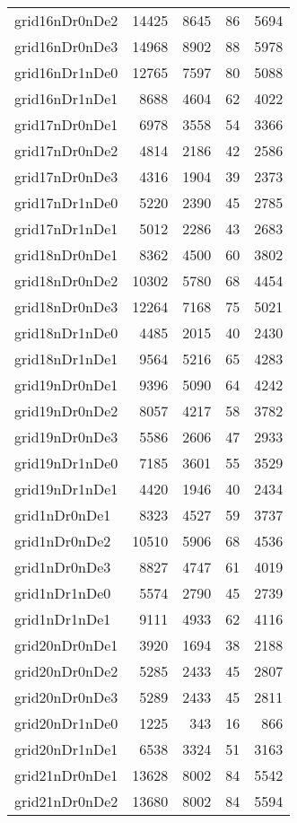 \begin{longtable}{lrrrr}
grid16nDr0nDe2 & 14425 & 8645 & 86 & 5694 \\
grid16nDr0nDe3 & 14968 & 8902 & 88 & 5978 \\
grid16nDr1nDe0 & 12765 & 7597 & 80 & 5088 \\
grid16nDr1nDe1 & 8688 & 4604 & 62 & 4022 \\
grid17nDr0nDe1 & 6978 & 3558 & 54 & 3366 \\
grid17nDr0nDe2 & 4814 & 2186 & 42 & 2586 \\
grid17nDr0nDe3 & 4316 & 1904 & 39 & 2373 \\
grid17nDr1nDe0 & 5220 & 2390 & 45 & 2785 \\
grid17nDr1nDe1 & 5012 & 2286 & 43 & 2683 \\
grid18nDr0nDe1 & 8362 & 4500 & 60 & 3802 \\
grid18nDr0nDe2 & 10302 & 5780 & 68 & 4454 \\
grid18nDr0nDe3 & 12264 & 7168 & 75 & 5021 \\
grid18nDr1nDe0 & 4485 & 2015 & 40 & 2430 \\
grid18nDr1nDe1 & 9564 & 5216 & 65 & 4283 \\
grid19nDr0nDe1 & 9396 & 5090 & 64 & 4242 \\
grid19nDr0nDe2 & 8057 & 4217 & 58 & 3782 \\
grid19nDr0nDe3 & 5586 & 2606 & 47 & 2933 \\
grid19nDr1nDe0 & 7185 & 3601 & 55 & 3529 \\
grid19nDr1nDe1 & 4420 & 1946 & 40 & 2434 \\
grid1nDr0nDe1 & 8323 & 4527 & 59 & 3737 \\
grid1nDr0nDe2 & 10510 & 5906 & 68 & 4536 \\
grid1nDr0nDe3 & 8827 & 4747 & 61 & 4019 \\
grid1nDr1nDe0 & 5574 & 2790 & 45 & 2739 \\
grid1nDr1nDe1 & 9111 & 4933 & 62 & 4116 \\
grid20nDr0nDe1 & 3920 & 1694 & 38 & 2188 \\
grid20nDr0nDe2 & 5285 & 2433 & 45 & 2807 \\
grid20nDr0nDe3 & 5289 & 2433 & 45 & 2811 \\
grid20nDr1nDe0 & 1225 & 343 & 16 & 866 \\
grid20nDr1nDe1 & 6538 & 3324 & 51 & 3163 \\
grid21nDr0nDe1 & 13628 & 8002 & 84 & 5542 \\
grid21nDr0nDe2 & 13680 & 8002 & 84 & 5594 \\

\end{longtable}
